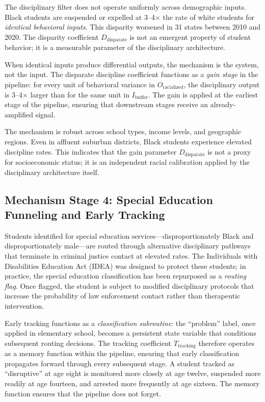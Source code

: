 The disciplinary filter does not operate uniformly across demographic inputs. Black students are suspended or expelled at 3--4$\times$ the rate of white students for \textit{identical behavioral inputs}. This disparity worsened in 31 states between 2010 and 2020. The disparity coefficient $D_{\text{disparate}}$ is not an emergent property of student behavior; it is a measurable parameter of the disciplinary architecture.

When identical inputs produce differential outputs, the mechanism is the system, not the input. The disparate discipline coefficient functions as a \textit{gain stage} in the pipeline: for every unit of behavioral variance in $O_{\text{racialized}}$, the disciplinary output is 3--4$\times$ larger than for the same unit in $I_{\text{buffer}}$. The gain is applied at the earliest stage of the pipeline, ensuring that downstream stages receive an already-amplified signal.

The mechanism is robust across school types, income levels, and geographic regions. Even in affluent suburban districts, Black students experience elevated discipline rates. This indicates that the gain parameter $D_{\text{disparate}}$ is not a proxy for socioeconomic status; it is an independent racial calibration applied by the disciplinary architecture itself.

\subsection{Mechanism Stage 4: Special Education Funneling and Early Tracking}

Students identified for special education services---disproportionately Black and disproportionately male---are routed through alternative disciplinary pathways that terminate in criminal justice contact at elevated rates. The Individuals with Disabilities Education Act (IDEA) was designed to protect these students; in practice, the special education classification has been repurposed as a \textit{routing flag}. Once flagged, the student is subject to modified disciplinary protocols that increase the probability of law enforcement contact rather than therapeutic intervention.

Early tracking functions as a \textit{classification subroutine}: the ``problem'' label, once applied in elementary school, becomes a persistent state variable that conditions subsequent routing decisions. The tracking coefficient $T_{\text{tracking}}$ therefore operates as a memory function within the pipeline, ensuring that early classification propagates forward through every subsequent stage. A student tracked as ``disruptive'' at age eight is monitored more closely at age twelve, suspended more readily at age fourteen, and arrested more frequently at age sixteen. The memory function ensures that the pipeline does not forget.

